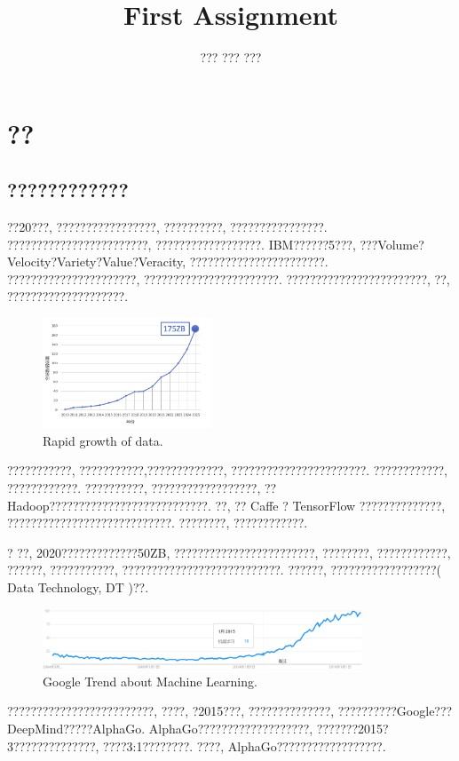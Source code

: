 \documentclass[lang=cn,11pt,a4paper]{elegantpaper}
\title{First Assignment}
\author{??? ??? ???}
\begin{document}

\newpage
\tableofcontents
\thispagestyle{empty}
\newpage
{}
\section{??}
\subsection{????????????}
\par ??20???, ?????????????????, ??????????, ????????????????. ????????????????????????, ??????????????????. IBM??????5???, ???Volume?Velocity?Variety?Value?Veracity, ???????????????????????.  ??????????????????????, ???????????????????????. ????????????????????????, ??, ????????????????????. 
\begin{figure}[htbp]
	\centering
	\includegraphics[width=0.45\textwidth]{Bigdata}
  	\caption{Rapid growth of data.\label{fig:data}}
\end{figure}
\par ???????????, ???????????,?????????????, ???????????????????????. ????????????, ????????????. ??????????, ??????????????????, ??Hadoop???????????????????????????. ??, ?? Caffe ? TensorFlow ??????????????, ????????????????????????????. ????????, ????????????. 
\par ? ??, 2020?????????????50ZB, ????????????????????????, ????????, ????????????, ??????, ???????????, ???????????????????????????. ??????, ??????????????????( Data Technology, DT )??.
\begin{figure}[htbp]
	\centering
	\includegraphics[width=0.85\textwidth]{GoogleTrend}
  	\caption{Google Trend about Machine Learning.\label{fig:GoogleTrend}}
\end{figure}
\par {} ?????????????????????????\cite{GT}, ????, ?2015???, ??????????????, ??????????Google???DeepMind?????AlphaGo. AlphaGo???????????????????, ???????2015?3??????????????, ????3:1????????. ????, AlphaGo??????????????????. 
\end{document}
